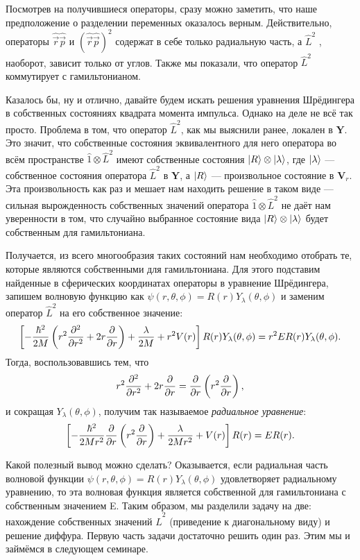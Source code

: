 Посмотрев на получившиеся операторы, сразу можно заметить, что наше
предположение о разделении переменных оказалось верным. Действительно,
операторы $\hat{\Vec{r}}\hat{\Vec{p}}$ и $(\hat{\Vec{r}}\hat{\Vec{p}})^2$
содержат в себе только радиальную часть, а $\hat{L}^2$ , наоборот, зависит
только от углов. Также мы показали, что оператор $\hat{L}^2$ коммутирует с
гамильтонианом.

Казалось бы, ну и отлично, давайте будем искать решения уравнения Шрёдингера в
собственных состояниях квадрата момента импульса. Однако на деле не всё так
просто. Проблема в том, что оператор $\hat{L}^2$, как мы выяснили ранее,
локален в $\mathbf{Y}$. Это значит, что собственные состояния эквивалентного
для него оператора во всём пространстве $\hat{1}\otimes\hat{L}^2$ имеют
собственные состояния $\lvert R\rangle\otimes\lvert\lambda\rangle$, где $\lvert\lambda\rangle$ ---
собственное состояния оператора $\hat{L}^2$ в $\mathbf{Y}$, а $\lvert R\rangle$ ---
произвольное состояние в $\mathbf{V}_r$. Эта произвольность как раз и мешает
нам находить решение в таком виде --- сильная вырожденность собственных
значений оператора $\hat{1}\otimes\hat{L}^2$ не даёт нам уверенности в том, что
случайно выбранное состояние вида $\lvert R\rangle\otimes\lvert\lambda\rangle$ будет
собственным для гамильтониана.

Получается, из всего многообразия таких состояний нам необходимо отобрать те,
которые являются собственными для гамильтониана. Для этого подставим найденные
в сферических координатах операторы в уравнение Шрёдингера, запишем волновую
функцию как $\psi(r, \theta, \phi) = R(r)Y_{\lambda}(\theta, \phi)$ и заменим
оператор $\hat{L}^2$ на его собственное значение:
\[
  \left[-\frac{\hbar^2}{2M}\left( r^2\frac{\partial^2}{\partial r^2} + 2r\frac{\partial }{\partial r} \right)  + \frac{\lambda}{2M} + r^2V(r)\right]R(r)Y_{\lambda}(\theta, \phi) = r^2ER(r)Y_{\lambda}(\theta, \phi).
\]
Тогда, воспользовавшись тем, что
\[
  r^2\frac{\partial^2}{\partial r^2} + 2r\frac{\partial }{\partial r} = \frac{\partial }{\partial r}\left( r^2 \frac{\partial }{\partial r}\right),
\]
и сокращая $Y_{\lambda}(\theta, \phi)$, получим так называемое
\textit{радиальное уравнение}:
\[
  \left[-\frac{\hbar^2}{2Mr^2}\frac{\partial }{\partial r}\left( r^2 \frac{\partial }{\partial r}\right)  + \frac{\lambda}{2Mr^2} + V(r)\right]R(r) = ER(r).
\]

Какой полезный вывод можно сделать? Оказывается, если радиальная часть волновой
функции $\psi(r, \theta, \phi) = R(r)Y_{\lambda}(\theta, \phi)$ удовлетворяет
радиальному уравнению, то эта волновая функция является собственной для
гамильтониана с собственным значением E. Таким образом, мы разделили задачу на
две: нахождение собственных значений $\hat{L}^2$ (приведение к диагональному
виду) и решение диффура. Первую часть задачи достаточно решить один раз. Этим
мы и займёмся в следующем семинаре.